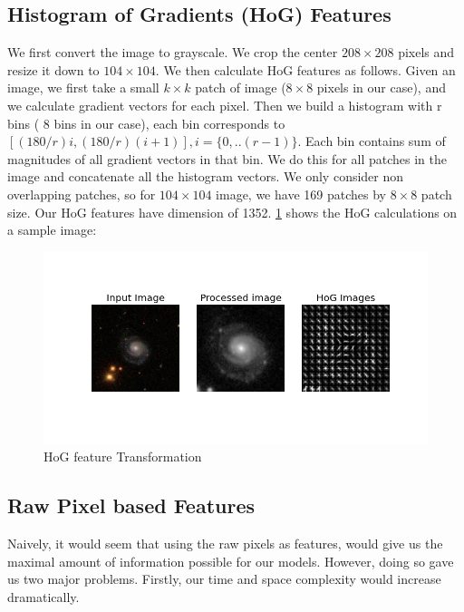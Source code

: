 \documentclass[10pt]{article}
\begin{document}
\subsection*{Histogram of Gradients (HoG) Features}
We first convert the image to grayscale. We crop the center $ 208 \times 208 $ pixels and resize it down to $104 \times 104$. We then calculate HoG features as follows. Given an image, we first take a small $k \times k$ patch of image ($8 \times 8$ pixels in our case), and we calculate gradient vectors for each pixel. Then we build a histogram with r bins ( 8 bins in our case), each bin corresponds to ${[(180/r)i, (180/r)(i+1)]} , i=\{0, .. (r-1)\}$. Each bin contains sum of magnitudes of all gradient vectors in that bin. We do this for all patches in the image and concatenate all the histogram vectors. We only consider non overlapping patches, so for $104 \times 104$ image, we have 169 patches by $8 \times 8$ patch size. Our HoG features have dimension of 1352. \ref{fig:hog} shows the HoG calculations on a sample image: 


\begin{figure}[h]
\begin{center}
\includegraphics[scale=0.6]{images/HoG_features_noisy.png}
\caption{HoG feature Transformation}
\end{center}
\label{fig:hog}
\end{figure}


\subsection*{Raw Pixel based Features}

Naively, it would seem that using the raw pixels as features, would give us the maximal amount of information possible for our models. However, doing so gave us two major problems. Firstly, our time and space complexity would increase dramatically.
\end{document}
